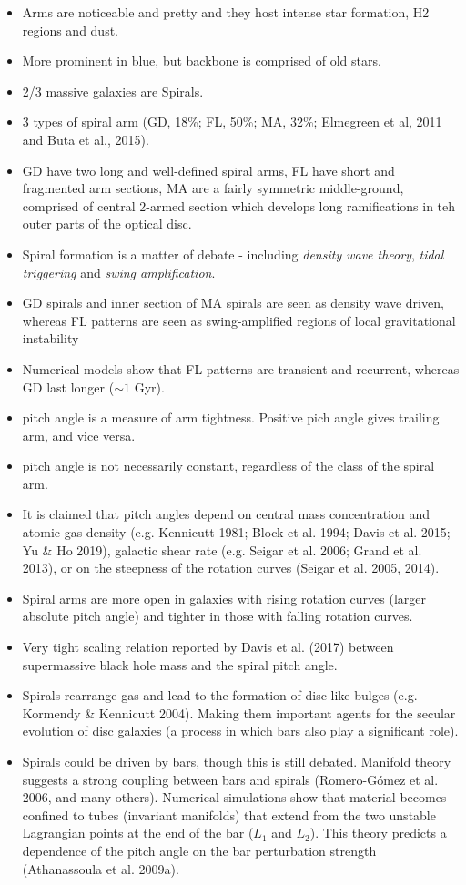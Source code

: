 \begin{itemize}
  \item Arms are noticeable and pretty and they host intense star formation, H2 regions and dust.
  \item More prominent in blue, but backbone is comprised of old stars.
  \item 2/3 massive galaxies are Spirals.
  \item 3 types of spiral arm (GD, 18\%; FL, 50\%; MA, 32\%; Elmegreen et al, 2011 and Buta et al., 2015).
  \item GD have two long and well-defined spiral arms, FL have short and fragmented arm sections, MA are a fairly symmetric middle-ground, comprised of central 2-armed section which develops long ramifications in teh outer parts of the optical disc.
  \item Spiral formation is a matter of debate - including \textit{density wave theory}, \textit{tidal triggering} and \textit{swing amplification}.
  \item GD spirals and inner section of MA spirals are seen as density wave driven, whereas FL patterns are seen as swing-amplified regions of local gravitational instability
  \item Numerical models show that FL patterns are transient and recurrent, whereas GD last longer ($\sim1$ Gyr).
  \item pitch angle is a measure of arm tightness. Positive pich angle gives trailing arm, and vice versa.
  \item pitch angle is not necessarily constant, regardless of the class of the spiral arm.
  \item It is claimed that pitch angles depend on central mass concentration and atomic gas density (e.g. Kennicutt 1981; Block et al. 1994; Davis et al. 2015; Yu \& Ho 2019), galactic shear rate (e.g. Seigar et al. 2006; Grand et al. 2013), or on the steepness of the rotation curves (Seigar et al. 2005, 2014).
  \item Spiral arms are more open in galaxies with rising rotation curves (larger absolute pitch angle) and tighter in those with falling rotation curves.
  \item Very tight scaling relation reported by Davis et al. (2017) between supermassive black hole mass and the spiral pitch angle.
  \item Spirals rearrange gas and lead to the formation of disc-like bulges (e.g. Kormendy \& Kennicutt 2004). Making them important agents for the secular evolution of disc galaxies (a process in which bars also play a significant role).
  \item Spirals could be driven by bars, though this is still debated. Manifold theory suggests a strong coupling between bars and spirals (Romero-G\'omez et al. 2006, and many others). Numerical simulations show that material becomes confined to tubes (invariant manifolds) that extend from the two unstable Lagrangian points at the end of the bar ($L_1$ and $L_2$). This theory predicts a dependence of the pitch angle on the bar perturbation strength (Athanassoula et al. 2009a).
\end{itemize}

